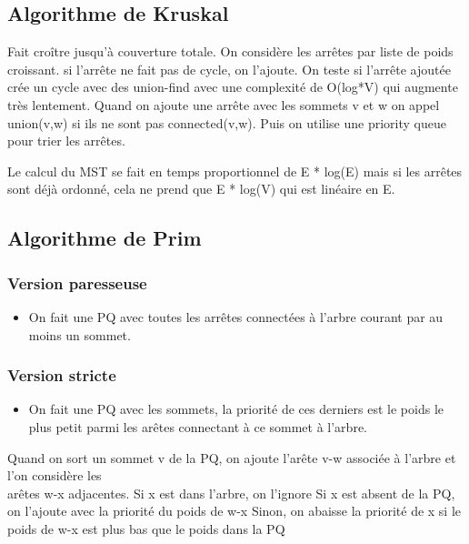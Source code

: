 \documentclass[
]{article}
\begin{document}
\hypertarget{header-n93}{%
\subsection{Algorithme de Kruskal}\label{header-n93}}

Fait croître jusqu'à couverture totale. On considère les arrêtes par
liste de poids croissant. si l'arrête ne fait pas de cycle, on l'ajoute.
On teste si l'arrête ajoutée crée un cycle avec des union-find avec une
complexité de O(log*V) qui augmente très lentement. Quand on ajoute une
arrête avec les sommets v et w on appel union(v,w) si ils ne sont pas
connected(v,w). Puis on utilise une priority queue pour trier les
arrêtes.

Le calcul du MST se fait en temps proportionnel de E * log(E) mais si
les arrêtes sont déjà ordonné, cela ne prend que E * log(V) qui est
linéaire en E.

\hypertarget{header-n96}{%
\subsection{Algorithme de Prim}\label{header-n96}}

\hypertarget{header-n97}{%
\subsubsection{Version paresseuse}\label{header-n97}}

\begin{itemize}
\item
  On fait une PQ avec toutes les arrêtes connectées à l'arbre courant
  par au moins un sommet. 
\end{itemize}

\hypertarget{header-n101}{%
\subsubsection{Version stricte}\label{header-n101}}

\begin{itemize}
\item
  On fait une PQ avec les sommets, la priorité de ces derniers est le
  poids le plus petit parmi les arêtes connectant à ce sommet à l'arbre.
\end{itemize}

Quand on sort un sommet v de la PQ, on ajoute l'arête v-w associée à
l'arbre et l'on considère les\\
arêtes w-x adjacentes. Si x est dans l'arbre, on l'ignore Si x est
absent de la PQ, on l'ajoute avec la priorité du poids de w-x Sinon, on
abaisse la priorité de x si le poids de w-x est plus bas que le poids
dans la PQ
\end{document}
